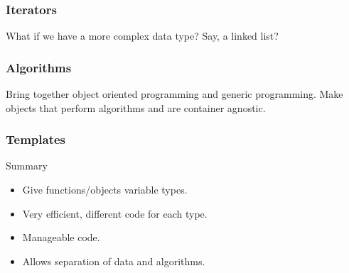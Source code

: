 \begin{frame}[fragile]
  \frametitle{Iterators}
  What if we have a more complex data type? Say, a linked list?
\end{frame}

\begin{frame}[fragile]
  \frametitle{Algorithms}
  Bring together object oriented programming and generic programming.
  Make objects that perform algorithms and are container agnostic.
\end{frame}

\begin{frame}[fragile]
  \frametitle{Templates}
  \begin{block}{Summary}
    \begin{itemize}
    \item Give functions/objects variable types.
    \item Very efficient, different code for each type.
    \item Manageable code.
    \item Allows separation of data and algorithms.
    \end{itemize}
  \end{block}
\end{frame}
